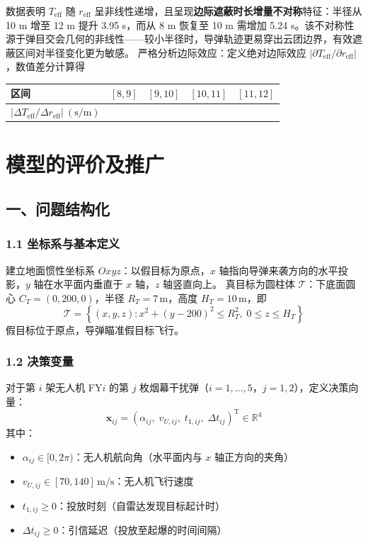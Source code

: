 \documentclass{JXUSTmodeling}
\begin{document}
数据表明 $T_{\mathrm{eff}}$ 随 $r_{\mathrm{eff}}$ 呈非线性递增，且呈现\textbf{边际遮蔽时长增量不对称}特征：半径从 10 m 增至 12 m 提升 3.95 s，而从 8 m 恢复至 10 m 需增加 5.24 s。该不对称性源于弹目交会几何的非线性——较小半径时，导弹轨迹更易穿出云团边界，有效遮蔽区间对半径变化更为敏感。
严格分析边际效应：定义绝对边际效应 $|\partial T_{\mathrm{eff}}/\partial r_{\mathrm{eff}}|$，数值差分计算得
\begin{table}[htbp]
  \centering
  \begin{tabularx}{\textwidth}{YYYYY}
    \toprule
    区间 & $[8,9]$ & $[9,10]$ & $[10,11]$ & $[11,12]$ \\
    \midrule
    $|\Delta T_{\mathrm{eff}}/\Delta r_{\mathrm{eff}}|\ (\mathrm{s/m})$ \\
    \bottomrule
  \end{tabularx}
\end{table}

\section{模型的评价及推广}
\subsection{一、问题结构化}
\subsubsection{1.1 坐标系与基本定义}
建立地面惯性坐标系 $Oxyz$：以假目标为原点，$x$ 轴指向导弹来袭方向的水平投影，$y$ 轴在水平面内垂直于 $x$ 轴，$z$ 轴竖直向上。
真目标为圆柱体 $\mathcal{T}$：下底面圆心 $C_T=(0, 200, 0)$，半径 $R_T=7\,\mathrm{m}$，高度 $H_T=10\,\mathrm{m}$，即
\begin{equation}
\mathcal{T}=\left\{(x,y,z): x^2+(y-200)^2\leq R_T^2,\; 0\leq z\leq H_T\right\} \tag{1.1}
\end{equation}
假目标位于原点，导弹瞄准假目标飞行。
\subsubsection{1.2 决策变量}
对于第 $i$ 架无人机 FY$i$ 的第 $j$ 枚烟幕干扰弹（$i=1,\ldots,5$，$j=1,2$），定义决策向量：
\begin{equation}
\mathbf{x}_{ij}=\left(\alpha_{ij},\; v_{U,ij},\; t_{1,ij},\; \Delta t_{ij}\right)^{\mathrm{T}} \in \mathbb{R}^4 \tag{1.2}
\end{equation}
其中：
\begin{itemize}
  \item $\alpha_{ij}\in[0,2\pi)$：无人机航向角（水平面内与 $x$ 轴正方向的夹角）
  \item $v_{U,ij}\in[70,140]\,\mathrm{m/s}$：无人机飞行速度
  \item $t_{1,ij}\geq 0$：投放时刻（自雷达发现目标起计时）
  \item $\Delta t_{ij}\geq 0$：引信延迟（投放至起爆的时间间隔）
\end{itemize}
\end{document}
